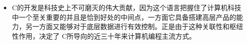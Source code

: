 \begin{frame}

\end{frame}


\begin{frame}

\end{frame}

\begin{frame}
\begin{itemize}
\item
C的开发是科技史上不可磨灭的伟大贡献，因为这个语言把握住了计算机科技中一个至关重要的并且是恰到好处的中间点，一方面它具备搭建高层产品的能力，另一方面又能够对于底层数据进行有效控制。正是由于这种关联性和枢纽性作用，决定了 C所导向的近三十年来计算机编程主流方式。
\end{itemize}

\end{frame}

